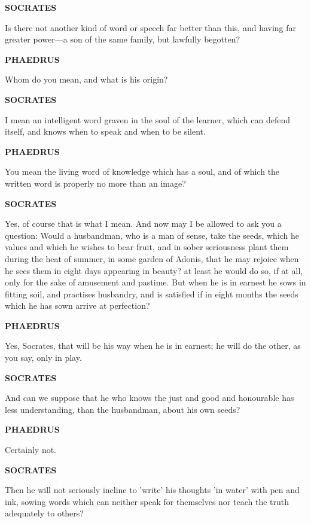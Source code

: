 \documentclass[11pt,letter]{article}
\begin{document}
\par \textbf{SOCRATES}
\par   Is there not another kind of word or speech far better than this, and having far greater power—a son of the same family, but lawfully begotten?

\par \textbf{PHAEDRUS}
\par   Whom do you mean, and what is his origin?

\par \textbf{SOCRATES}
\par   I mean an intelligent word graven in the soul of the learner, which can defend itself, and knows when to speak and when to be silent.

\par \textbf{PHAEDRUS}
\par   You mean the living word of knowledge which has a soul, and of which the written word is properly no more than an image?

\par \textbf{SOCRATES}
\par   Yes, of course that is what I mean. And now may I be allowed to ask you a question:  Would a husbandman, who is a man of sense, take the seeds, which he values and which he wishes to bear fruit, and in sober seriousness plant them during the heat of summer, in some garden of Adonis, that he may rejoice when he sees them in eight days appearing in beauty? at least he would do so, if at all, only for the sake of amusement and pastime. But when he is in earnest he sows in fitting soil, and practises husbandry, and is satisfied if in eight months the seeds which he has sown arrive at perfection?

\par \textbf{PHAEDRUS}
\par   Yes, Socrates, that will be his way when he is in earnest; he will do the other, as you say, only in play.

\par \textbf{SOCRATES}
\par   And can we suppose that he who knows the just and good and honourable has less understanding, than the husbandman, about his own seeds?

\par \textbf{PHAEDRUS}
\par   Certainly not.

\par \textbf{SOCRATES}
\par   Then he will not seriously incline to 'write' his thoughts 'in water' with pen and ink, sowing words which can neither speak for themselves nor teach the truth adequately to others?
\end{document}
